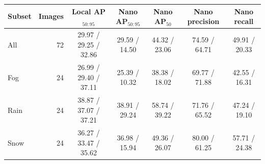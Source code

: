 \noindent\begin{minipage}{\linewidth}
\centering\small\renewcommand{\arraystretch}{1.12}\setlength{\tabcolsep}{3.5pt}
\label{tab:dawn-operating}
\begin{tabular}{@{}lrccccc@{}}\toprule
Subset & Images & Local AP$_{50:95}$ & Nano AP$_{50:95}$ & Nano AP$_{50}$ & Nano precision & Nano recall\\
\midrule
All & 72 & 29.97 / 29.25 / 32.86 & 29.59 / 14.50 & 44.32 / 23.06 & 74.59 / 64.71 & 49.91 / 20.33\\
Fog & 24 & 26.99 / 29.40 / 37.11 & 25.39 / 10.32 & 38.38 / 18.02 & 69.77 / 71.88 & 42.55 / 16.31\\
Rain & 24 & 38.87 / 37.07 / 37.21 & 38.91 / 29.24 & 58.74 / 39.22 & 71.76 / 65.52 & 47.24 / 19.10\\
Snow & 24 & 36.27 / 33.47 / 35.62 & 36.98 / 15.94 & 49.36 / 26.07 & 80.00 / 61.25 & 57.71 / 24.38\\
\bottomrule
\end{tabular}
\end{minipage}\par
